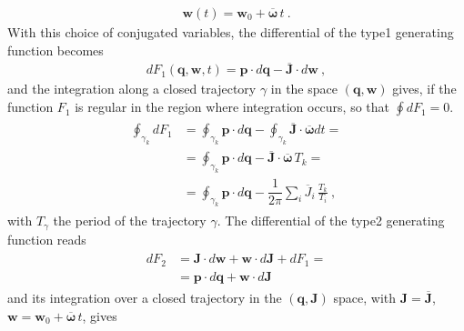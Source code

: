 \documentclass[letterpaper,10pt,english]{jupyterBook}
\begin{document}
\begin{equation*}
\begin{split}\mathbf{w}(t) = \mathbf{w}_0 + \overline{ \boldsymbol{\omega} } \, t \ .\end{split}
\end{equation*}
\sphinxAtStartPar
{} With this choice of conjugated variables, the differential of the type\sphinxhyphen{}1 generating function becomes
\begin{equation*}
\begin{split}d F_1(\mathbf{q}, \mathbf{w}, t) = \mathbf{p} \cdot d \mathbf{q} - \overline{\mathbf{J}} \cdot d \mathbf{w} \ ,\end{split}
\end{equation*}
\sphinxAtStartPar
and the integration along a closed trajectory \(\gamma\) in the space \((\mathbf{q}, \mathbf{w})\) gives, if the function \(F_1\) is regular in the region where integration occurs, so that \(\oint d F_1 = 0\).
\begin{equation*}
\begin{split}\begin{aligned}
  \oint_{\gamma_k} d F_1
  & = \oint_{\gamma_k} \mathbf{p} \cdot d \mathbf{q} - \oint_{\gamma_k} \overline{\mathbf{J}} \cdot  \overline{\boldsymbol{\omega}} dt = \\
  & = \oint_{\gamma_k} \mathbf{p} \cdot d \mathbf{q} - \overline{\mathbf{J}} \cdot  \overline{\boldsymbol{\omega}} \, T_{k} = \\
  & = \oint_{\gamma_k} \mathbf{p} \cdot d \mathbf{q} - \dfrac{1}{2\pi} \sum_{i} \overline{J}_i \, \frac{T_{k}}{T_i} \ ,
\end{aligned}\end{split}
\end{equation*}
\sphinxAtStartPar
with \(T_{\gamma}\) the period of the trajectory \(\gamma\). The differential of the type\sphinxhyphen{}2 generating function reads
\begin{equation*}
\begin{split}\begin{aligned}
  d F_2 
  & = \mathbf{J} \cdot d \mathbf{w} + \mathbf{w} \cdot d \mathbf{J} + d F_1 = \\
  & = \mathbf{p} \cdot d \mathbf{q} + \mathbf{w} \cdot d \mathbf{J}
\end{aligned}\end{split}
\end{equation*}
\sphinxAtStartPar
and its integration over a closed trajectory in the \((\mathbf{q}, \mathbf{J})\) space, with \(\mathbf{J} = \overline{\mathbf{J}}\), \(\mathbf{w} = \mathbf{w}_0 + \overline{\boldsymbol\omega} \, t\), gives
\end{document}
